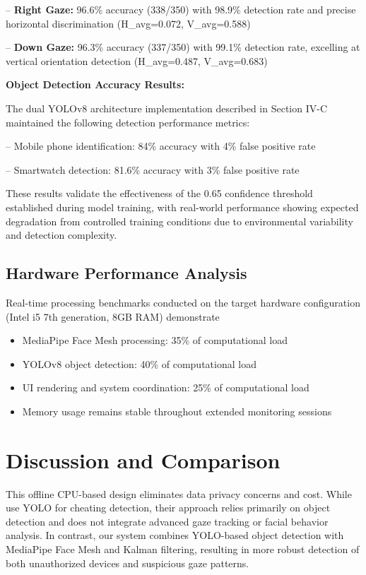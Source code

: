 \documentclass[conference]{IEEEtran}
\begin{document}
-- \textbf{Right Gaze:} 96.6\% accuracy (338/350) with 98.9\% detection rate and precise horizontal discrimination (H\_avg=0.072, V\_avg=0.588)

-- \textbf{Down Gaze:} 96.3\% accuracy (337/350) with 99.1\% detection rate, excelling at vertical orientation detection (H\_avg=0.487, V\_avg=0.683)

\textbf{Object Detection Accuracy Results:}

The dual YOLOv8 architecture implementation described in Section IV-C maintained 
the following detection performance metrics:

-- Mobile phone identification: 84\% accuracy with 4\% false positive rate

-- Smartwatch detection: 81.6\% accuracy with 3\% false positive rate

These results validate the effectiveness of the 0.65 confidence threshold established 
during model training, with real-world performance showing expected degradation from 
controlled training conditions due to environmental variability and detection complexity.

\subsection{Hardware Performance Analysis}

Real-time processing benchmarks conducted on the target hardware configuration 
(Intel i5 7th generation, 8GB RAM) demonstrate

\begin{itemize}
    \item MediaPipe Face Mesh processing: 35\% of computational load
    \item YOLOv8 object detection: 40\% of computational load
    \item UI rendering and system coordination: 25\% of computational load
    \item Memory usage remains stable throughout extended monitoring sessions
\end{itemize}

\section{Discussion and Comparison}
This offline CPU-based design eliminates data privacy concerns and cost. While \cite{kaddoura2022} use YOLO for cheating detection, their approach relies primarily on object detection and does not integrate advanced gaze tracking or facial behavior analysis. In contrast, our system combines YOLO-based object detection with MediaPipe Face Mesh\cite{mediapipe2023docs} and Kalman filtering\cite{kalmanOcclusion2022,li2020hksiamfc}, resulting in more robust detection of both unauthorized devices and suspicious gaze patterns.
\end{document}
